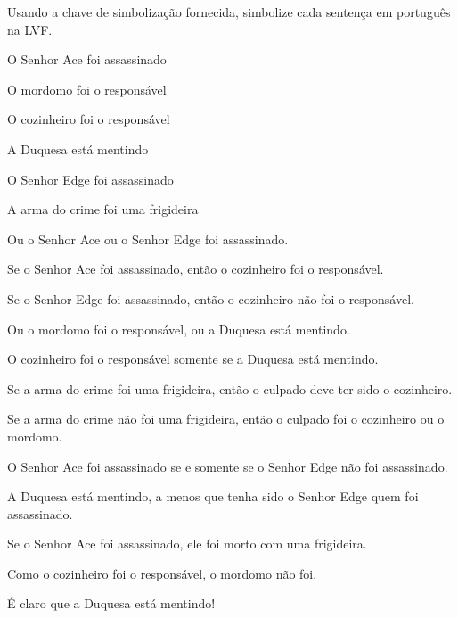 \problempart Usando a chave de simbolização fornecida, simbolize cada sentença em português na LVF.
\begin{ekey}
\item[A] O Senhor Ace foi assassinado
\item[B] O mordomo foi o responsável
\item[C] O cozinheiro foi o responsável
\item[D] A Duquesa está mentindo
\item[E] O Senhor Edge foi assassinado
\item[F] A arma do crime foi uma frigideira
\end{ekey}
\begin{compactlist}
\item Ou o Senhor Ace ou o Senhor Edge foi assassinado.
\item Se o Senhor Ace foi assassinado, então o cozinheiro foi o responsável.
\item Se o Senhor Edge foi assassinado, então o cozinheiro não foi o responsável.
\item Ou o mordomo foi o responsável, ou a Duquesa está mentindo.
\item O cozinheiro foi o responsável somente se a Duquesa está mentindo.
\item Se a arma do crime foi uma frigideira, então o culpado deve ter sido o cozinheiro.
\item Se a arma do crime não foi uma frigideira, então o culpado foi o cozinheiro ou o mordomo.
\item O Senhor Ace foi assassinado se e somente se o Senhor Edge não foi assassinado.
\item A Duquesa está mentindo, a menos que tenha sido o Senhor Edge quem foi assassinado.
\item Se o Senhor Ace foi assassinado, ele foi morto com uma frigideira.
\item Como o cozinheiro foi o responsável, o mordomo não foi.
\item É claro que a Duquesa está mentindo!
\end{compactlist}

\solutions

